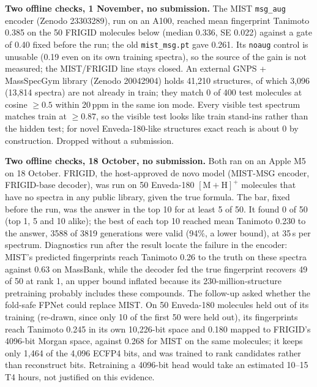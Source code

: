 \documentclass[11pt]{article}
\begin{document}
\textbf{Two offline checks, 1 November, no submission.} The MIST \texttt{msg\_aug} encoder
(Zenodo 23303289), run on an A100, reached mean fingerprint Tanimoto 0.385 on the 50 FRIGID molecules below
(median 0.336, SE 0.022) against a gate of 0.40 fixed before the run; the old \texttt{mist\_msg.pt} gave 0.261.
Its \texttt{noaug} control is unusable (0.19 even on its own training spectra), so the source of the gain is not
measured; the MIST/FRIGID line stays closed. An external GNPS + MassSpecGym library (Zenodo 20042904) holds
41{,}210 structures, of which 3{,}096 (13{,}814 spectra) are not already in train; they match 0 of 400 test
molecules at cosine $\geq 0.5$ within 20\,ppm in the same ion mode. Every visible test spectrum matches train at
$\geq 0.87$, so the visible test looks like train stand-ins rather than the hidden test; for novel
Enveda-180-like structures exact reach is about 0 by construction. Dropped without a submission.

\textbf{Two offline checks, 18 October, no submission.} Both ran on an Apple M5 on 18 October. FRIGID, the
host-approved de novo model (MIST-MSG encoder, FRIGID-base decoder), was run on 50 Enveda-180
$[\mathrm{M{+}H}]^+$ molecules that have no spectra in any public library, given the true formula.
The bar, fixed before the run, was the answer in the top 10 for at least 5 of 50. It found 0 of 50
(top 1, 5 and 10 alike); the best of each top 10 reached mean Tanimoto 0.230 to the answer, 3588 of
3819 generations were valid (94\%, a lower bound), at 35\,s per spectrum. Diagnostics run after the
result locate the failure in the encoder: MIST's predicted fingerprints reach Tanimoto 0.26 to the
truth on these spectra against 0.63 on MassBank, while the decoder fed the true fingerprint recovers
49 of 50 at rank 1, an upper bound inflated because its 230-million-structure pretraining probably
includes these compounds. The follow-up asked whether the fold-safe FPNet could replace MIST. On 50
Enveda-180 molecules held out of its training (re-drawn, since only 10 of the first 50 were held out),
its fingerprints reach Tanimoto 0.245 in its own 10{,}226-bit space and 0.180 mapped to FRIGID's
4096-bit Morgan space, against 0.268 for MIST on the same molecules; it keeps only 1{,}464 of the
4{,}096 ECFP4 bits, and was trained to rank candidates rather than reconstruct bits. Retraining a
4096-bit head would take an estimated 10--15 T4 hours, not justified on this evidence.
\end{document}
